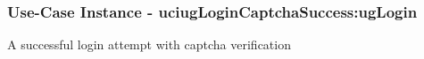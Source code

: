 
	\subsubsection{Use-Case Instance - uciugLoginCaptchaSuccess:ugLogin}
	
	A successful login attempt with captcha verification		  
	\begin{operationmodel}
	
	\end{operationmodel} 

	
